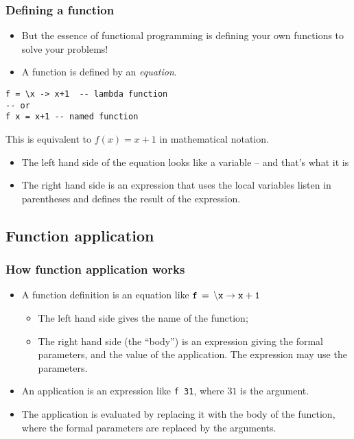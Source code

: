 \documentclass{beamer}
\begin{document}
\begin{frame}[fragile]
\frametitle{Defining a function}

\begin{itemize}
\item But the essence of functional programming is defining your own
  functions to solve your problems!
\item A function is defined by an
  \emph{equation}.
\end{itemize}

\begin{verbatim}
f = \x -> x+1  -- lambda function
-- or
f x = x+1 -- named function
\end{verbatim}

This is equivalent to $f(x) = x+1$ in mathematical notation.

\begin{itemize}
\item The left hand side of the equation looks like a variable -- and that's what it is
\item The right hand side is an expression that uses the local variables listen in parentheses and defines the result of the expression.

\end{itemize}

\end{frame}

\subsection{Function application}

\begin{frame}[fragile]
\frametitle{How function application works}

\begin{itemize}
\item A function definition is an equation like $\tt{f \, =\, \backslash x \rightarrow x+1}$
  \begin{itemize}
  \item The left hand side gives the name of the function;
  \item The right hand side (the ``body'') is an expression giving the
    formal parameters, and  the value of the application.  The expression may use the
    parameters.
  \end{itemize}
\item An application is an expression like \texttt{f 31}, where $31$ is
  the argument.
\item The application is evaluated by replacing it with the body of
  the function, where the formal parameters are replaced by the
  arguments.
\end{itemize}

\end{frame}
\end{document}
